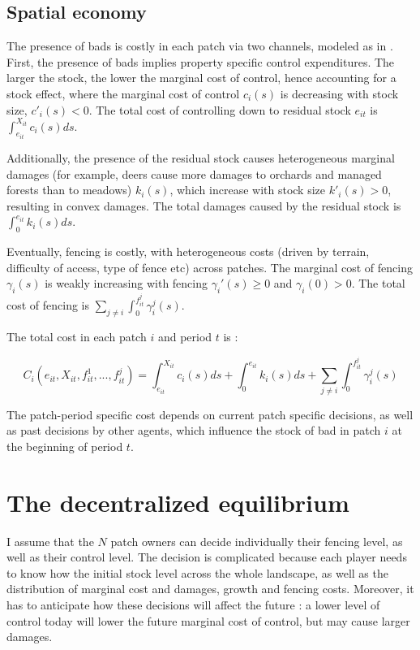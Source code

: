 \subsection{Spatial economy}

The presence of bads is costly in each patch via two channels, modeled as in \cite{costello_private_2017}. First, the presence of bads implies property specific control expenditures. The larger the stock, the lower the marginal cost of control, hence accounting for a stock effect, where the marginal cost of control $c_i(s)$ is decreasing with stock size, $c'_i(s)<0$. The total cost of controlling down to residual stock $e_{it}$ is $\int_{e_{it}}^{X_{it}}c_i(s)ds$. 

Additionally, the presence of the residual stock causes heterogeneous marginal damages (for example, deers cause more damages to orchards and managed forests  than to meadows) $k_i(s)$, which increase with stock size $k'_i(s)>0$, resulting in convex damages. The total damages caused by the residual stock is $\int_{0}^{e_{it}}k_i(s)ds$.

Eventually, fencing is costly, with heterogeneous costs (driven by terrain, difficulty of access, type of fence etc) across patches. The marginal cost of fencing $\gamma_i(s)$ is weakly increasing with fencing $\gamma_i'(s)\geq 0$ and $\gamma_i(0)>0$. The total cost of fencing is  $ \sum_{j\neq i} \int_{0}^{f_{it}^j} \gamma_i^j(s)$.

The total cost in each patch $i$ and period $t$ is : 

\begin{equation}
C_i(e_{it}, X_{it}, f_{it}^1, ..., f_{it}^j) = \int_{e_{it}}^{X_{it}}c_i(s)ds + \int_{0}^{e_{it}}k_i(s)ds + \sum_{j\neq i } \int_{0}^{f_{it}^j} \gamma_i^j(s)
\end{equation}

The patch-period specific cost depends on current patch specific decisions, as well as past decisions by other agents, which influence the stock of bad in patch $i$ at the beginning of period $t$. 

\section{The decentralized equilibrium}

I assume that the $N$ patch owners can decide individually their fencing level, as well as their control level. The decision is complicated because each player needs to know how the initial stock level across the whole landscape, as well as the distribution of marginal cost and damages, growth and fencing costs. Moreover, it has to anticipate how these decisions will affect the future : a lower level of control today will lower the future marginal cost of control, but may cause larger damages.


